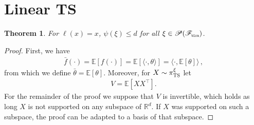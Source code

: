 \documentclass[letter, 12pt]{report}
\newcommand{\pr}{\text{\tiny\texttt{r}}}
\newcommand{\pb}{\text{\tiny\texttt{b}}}
\newcommand{\pl}{\text{\tiny\texttt{l}}}
\renewcommand{\pm}{\text{\tiny\texttt{m}}}
\newcommand{\R}{\mathbb R}
\newcommand{\E}{\mathbb E}
\newcommand{\sF}{\mathscr F}
\newcommand{\sP}{\mathscr P}
\newcommand{\1}{\mathbf{1}}
\newcommand{\ts}{\textsc{TS}\xspace}
\theoremstyle{plain}
\newtheorem{theorem}{Theorem}
\theoremstyle{definition}
\theoremstyle{remark}
\begin{document}
\section{Linear \ts}
\begin{theorem}
    For $\ell(x) = x$, $\psi(\xi) \leq d$ for all $\xi \in \sP(\sF_{\pb\pl\pr\pm})$.
    \label{thm:ir-ts-linear}
\end{theorem}
\begin{proof}
    First, we have
    \begin{align*}
        \bar f(\cdot) = \E[f(\cdot)] = \E[\langle \cdot, \theta \rangle] = \langle \cdot, \E[\theta]\rangle\,,
    \end{align*}
    from which we define $\bar{\theta} = \E[\theta]$.
    Moreover, for $X \sim \pi_\ts^\xi$ let
    \begin{align*}
        V = \E[X X^\top].
    \end{align*}
    For the remainder of the proof we suppose that $V$ is invertible,
    which holds as long $X$ is not supported on any subspace of $\R^d$.
    If $X$ was supported on such a subspace, the proof can be adapted
    to a basis of that subspace.


\end{proof}
\end{document}
